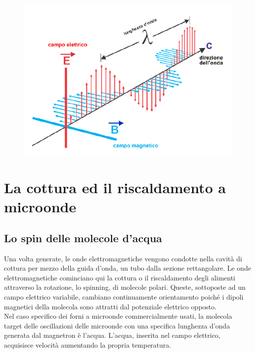 \documentclass{article}
\begin{document}
 \begin{figure}[h]
\centering
\includegraphics[scale=0.28]{12.png}
\label{fig: cubed graph}
\end{figure}

\newpage
\section{La cottura ed il riscaldamento a microonde }
\subsection{Lo spin delle molecole d'acqua} 
Una volta generate, le onde elettromagnetiche vengono condotte nella cavità di cottura per mezzo della guida d'onda, un tubo dalla sezione rettangolare. 
Le onde elettromagnetiche cominciano qui la cottura o il riscaldamento degli alimenti attraverso la rotazione, lo spinning, di molecole polari. Queste, sottoposte ad un campo elettrico variabile, cambiano continuamente orientamento poiché i dipoli magnetici della molecola sono attratti dal potenziale elettrico opposto.\\ 

Nel caso specifico dei forni a microonde commercialmente usati, la molecola target delle oscillazioni delle microonde con una specifica lunghezza d'onda generata dal magnetron è l'acqua. 
L'acqua, inserita nel campo elettrico, acquisisce velocità aumentando la propria temperatura.\\
\end{document}
